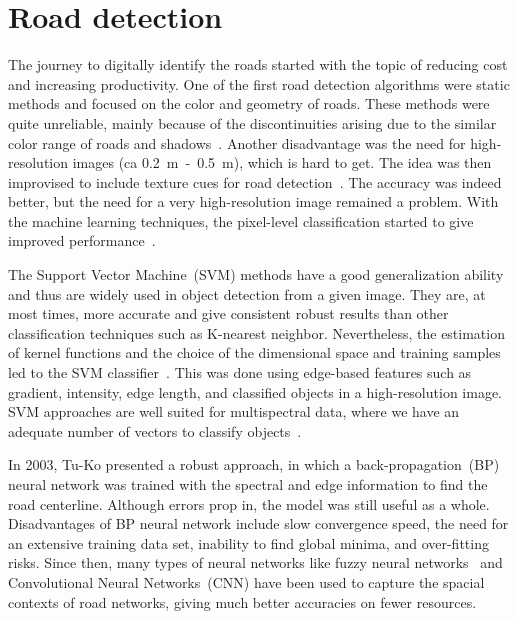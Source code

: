 \section{Road detection}\label{sec:roadDetection}
The journey to digitally identify the roads started with the topic of reducing cost and increasing productivity. One of the first road detection algorithms were static methods and focused on the color and geometry of roads. These methods were quite unreliable, mainly because of the discontinuities arising due to the similar color range of roads and shadows~\cite{Detecting_interections_using_color,Detecting_roads_using_color}. Another disadvantage was the need for high-resolution images (ca 0.2~m~-~0.5~m), which is hard to get. The idea was then improvised to include texture cues for road detection~\cite{using_texture_for_road_detection,baumgartner1999automatic}. The accuracy was indeed better, but the need for a very high-resolution image remained a problem. With the machine learning techniques, the pixel-level classification started to give improved performance~\cite{road_detection_using_neural_nets_SVM,road_detection_using_env_learning,road_detection_using_SVM_online_learning}.

The Support Vector Machine~(SVM) methods have a good generalization ability and thus are widely used in object detection from a given image. They are, at most times, more accurate and give consistent robust results than other classification techniques such as K-nearest neighbor. Nevertheless, the estimation of kernel functions and the choice of the dimensional space and training samples led to the SVM classifier~\cite{YagerSowmya2003,melgani2004classification}. This was done using edge-based features such as gradient, intensity, edge length, and classified objects in a high-resolution image. SVM approaches are well suited for multispectral data, where we have an adequate number of vectors to classify objects~\cite{Simler2011}.

In 2003, Tu-Ko presented a robust approach, in which a back-propagation~(BP) neural network was trained with the spectral and edge information to find the road centerline. Although errors prop in, the model was still useful as a whole. Disadvantages of BP neural network include slow convergence speed, the need for an extensive training data set, inability to find global minima, and over-fitting risks. Since then, many types of neural networks like fuzzy neural networks~\cite{mokhtarzade2008automatic} and Convolutional Neural Networks~(CNN) have been used to capture the spacial contexts of road networks, giving much better accuracies on fewer resources.

